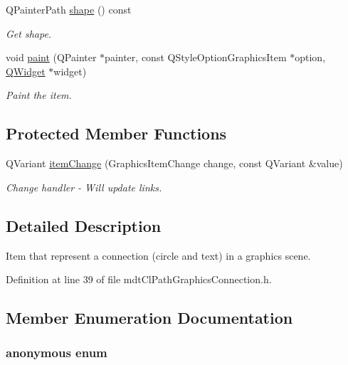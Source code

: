 \begin{DoxyCompactItemize}
Q\-Painter\-Path \hyperlink{classmdt_cl_path_graphics_connection_ab8cdca8e618caa986197c46d104b2eb5}{shape} () const 
\begin{DoxyCompactList}\small\item\em Get shape. \end{DoxyCompactList}\item 
void \hyperlink{classmdt_cl_path_graphics_connection_ae5ae525a6a7cfbc8be1b61ed0b355bc9}{paint} (Q\-Painter $\ast$painter, const Q\-Style\-Option\-Graphics\-Item $\ast$option, \hyperlink{class_q_widget}{Q\-Widget} $\ast$widget)
\begin{DoxyCompactList}\small\item\em Paint the item. \end{DoxyCompactList}\end{DoxyCompactItemize}
\subsection*{Protected Member Functions}
\begin{DoxyCompactItemize}
\item 
Q\-Variant \hyperlink{classmdt_cl_path_graphics_connection_a59dd72cba30a0ea3053df96198113886}{item\-Change} (Graphics\-Item\-Change change, const Q\-Variant \&value)
\begin{DoxyCompactList}\small\item\em Change handler -\/ Will update links. \end{DoxyCompactList}\end{DoxyCompactItemize}


\subsection{Detailed Description}
Item that represent a connection (circle and text) in a graphics scene. 

Definition at line 39 of file mdt\-Cl\-Path\-Graphics\-Connection.\-h.



\subsection{Member Enumeration Documentation}
\hypertarget{classmdt_cl_path_graphics_connection_adb7a7919297de79c33962e62655af050}{\subsubsection[{anonymous enum}]{\setlength{\rightskip}{0pt plus 5cm}anonymous enum}}\label{classmdt_cl_path_graphics_connection_adb7a7919297de79c33962e62655af050}


